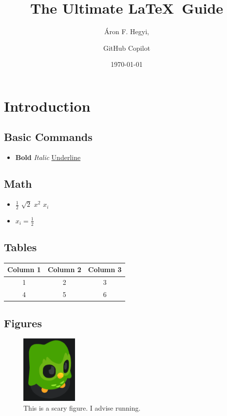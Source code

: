 \documentclass{article}
\title{The Ultimate \LaTeX\ Guide}
\date{\today}
\author{Áron F. Hegyi,
\and GitHub Copilot}
\begin{document}
\maketitle
\section{Introduction}

\subsection{Basic Commands}
\begin{itemize}
    \item \textbf{Bold} \textit{Italic} \underline{Underline}
\end{itemize}

\subsection{Math}
\begin{itemize}
    \item \(\frac{1}{2}\) \(\sqrt{2}\) \(x^2\) \(x_{i}\)
    \item \(x_{i} = \frac{1}{2}\)
\end{itemize}

\subsection{Tables}
\begin{table}[ht]
    \begin{tabular}{|c|c|c|}
        \hline
        \textbf{Column 1} & \textbf{Column 2} & \textbf{Column 3} \\
        \hline
        1                 & 2                 & 3                 \\
        \hline
        4                 & 5                 & 6                 \\
        \hline
    \end{tabular}
\end{table}


\subsection{Figures}
\begin{figure}[ht]
    \centering
    \includegraphics[width=0.25\textwidth]{test.png}
    \caption{This is a scary figure. I advise running.}
\end{figure}
\end{document}
